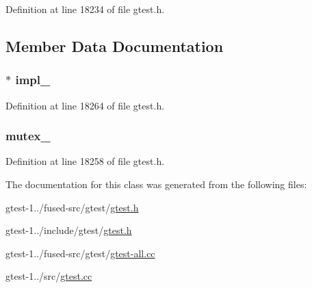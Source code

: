 \-Definition at line 18234 of file gtest.\-h.



\subsection{\-Member \-Data \-Documentation}
\hypertarget{classtesting_1_1UnitTest_ab9762ae576a7c728237a91400bd2c11f}{
\subsubsection[{impl\-\_\-}]{ $\ast$ {\bf impl\-\_\-}}}\label{d5/d21/classtesting_1_1UnitTest_ab9762ae576a7c728237a91400bd2c11f}


\-Definition at line 18264 of file gtest.\-h.

\hypertarget{classtesting_1_1UnitTest_ac9dde2076fedd43264499dc77faea627}{
\subsubsection[{mutex\-\_\-}]{ {\bf mutex\-\_\-}}}\label{d5/d21/classtesting_1_1UnitTest_ac9dde2076fedd43264499dc77faea627}


\-Definition at line 18258 of file gtest.\-h.



\-The documentation for this class was generated from the following files\-:\begin{DoxyCompactItemize}
\item 
gtest-\/1../fused-\/src/gtest/\hyperlink{fused-src_2gtest_2gtest_8h}{gtest.\-h}\item 
gtest-\/1../include/gtest/\hyperlink{include_2gtest_2gtest_8h}{gtest.\-h}\item 
gtest-\/1../fused-\/src/gtest/\hyperlink{fused-src_2gtest_2gtest-all_8cc}{gtest-\/all.\-cc}\item 
gtest-\/1../src/\hyperlink{gtest_8cc}{gtest.\-cc}\end{DoxyCompactItemize}
